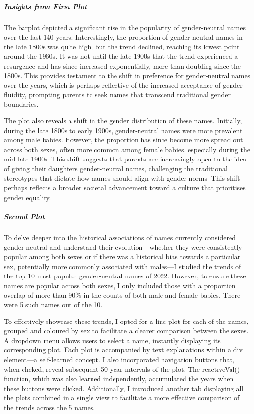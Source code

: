\documentclass[
]{article}
\begin{document}
\hypertarget{insights-from-first-plot}{%
\subparagraph{\texorpdfstring{\textbf{Insights from First
Plot}}{Insights from First Plot}}\label{insights-from-first-plot}}

The barplot depicted a significant rise in the popularity of
gender-neutral names over the last 140 years. Interestingly, the
proportion of gender-neutral names in the late 1800s was quite high, but
the trend declined, reaching its lowest point around the 1960s. It was
not until the late 1900s that the trend experienced a resurgence and has
since increased exponentially, more than doubling since the 1800s. This
provides testament to the shift in preference for gender-neutral names
over the years, which is perhaps reflective of the increased acceptance
of gender fluidity, prompting parents to seek names that transcend
traditional gender boundaries.

The plot also reveals a shift in the gender distribution of these names.
Initially, during the late 1800s to early 1900s, gender-neutral names
were more prevalent among male babies. However, the proportion has since
become more spread out across both sexes, often more common among female
babies, especially during the mid-late 1900s. This shift suggests that
parents are increasingly open to the idea of giving their daughters
gender-neutral names, challenging the traditional stereotypes that
dictate how names should align with gender norms. This shift perhaps
reflects a broader societal advancement toward a culture that
prioritises gender equality.

\hypertarget{second-plot}{%
\subparagraph{\texorpdfstring{\textbf{Second
Plot}}{Second Plot}}\label{second-plot}}

To delve deeper into the historical associations of names currently
considered gender-neutral and understand their evolution---whether they
were consistently popular among both sexes or if there was a historical
bias towards a particular sex, potentially more commonly associated with
males---I studied the trends of the top 10 most popular gender-neutral
names of 2022. However, to ensure these names are popular across both
sexes, I only included those with a proportion overlap of more than 90\%
in the counts of both male and female babies. There were 5 such names
out of the 10.

To effectively showcase these trends, I opted for a line plot for each
of the names, grouped and coloured by sex to facilitate a clearer
comparison between the sexes. A dropdown menu allows users to select a
name, instantly displaying its corresponding plot. Each plot is
accompanied by text explanations within a div element---a self-learned
concept. I also incorporated navigation buttons that, when clicked,
reveal subsequent 50-year intervals of the plot. The reactiveVal()
function, which was also learned independently, accumulated the years
when these buttons were clicked. Additionally, I introduced another tab
displaying all the plots combined in a single view to facilitate a more
effective comparison of the trends across the 5 names.
\end{document}
